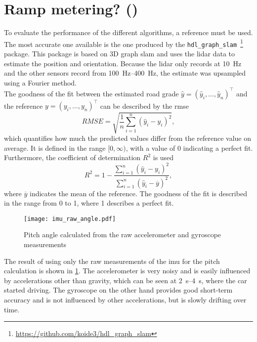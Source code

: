 \section{Ramp metering? ()}
To evaluate the performance of the different algorithms, a reference must be used.
The most accurate one available is the one produced by the \texttt{hdl\_graph\_slam}~\footnote{\url{https://github.com/koide3/hdl_graph_slam}} package.
This package is based on 3D graph slam and uses the \gls{lidar} data to estimate the position and orientation.
Because the \gls{lidar} only records at \SI{10}{\hertz} and the other sensors record from \SIrange{100}{400}{\hertz}, the estimate was upsampled using a Fourier method.\\
The goodness of the fit between the estimated road grade $\hat{y} = (\hat{y}_i, \dots, \hat{y}_n)^\intercal$ and the reference $y = (y_i, \dots, y_n)^\intercal$ can be described by the \gls{rmse}
\begin{equation}
	RMSE = \sqrt{\frac{1}{n}\sum_{i = 1}^n(\hat{y}_i - y_i)^2},
\end{equation}
which quantifies how much the predicted values differ from the reference value on average.
It is defined in the range $[0, \infty)$, with a value of 0 indicating a perfect fit.
Furthermore, the coefficient of determination $R^2$ is used
\begin{equation}
	R^2 = 1 - \frac{\sum\limits_{i = 1}^n(\hat{y}_i - y_i)^2}{\sum\limits_{i = 1}^n(\hat{y}_i - \overline{y})^2},
\end{equation}
where $\overline{y}$ indicates the mean of the reference.
The goodness of the fit is described in the range from 0 to 1, where 1 describes a perfect fit.
\begin{figure}[htbp]
	\centering
	\texttt{[image: imu\_raw\_angle.pdf]}
	\caption[Raw]{Pitch angle calculated from the raw accelerometer and gyroscope measurements}
	\label{fig:imu_raw_angle}
\end{figure}
The result of using only the raw measurements of the \gls{imu} for the pitch calculation is shown in \cref{fig:imu_raw_angle}.
The accelerometer is very noisy and is easily influenced by accelerations other than gravity, which can be seen at \SIrange{2}{4}{\second}, where the car started driving.
The gyroscope on the other hand provides good short-term accuracy and is not influenced by other accelerations, but is slowly drifting over time.\\
